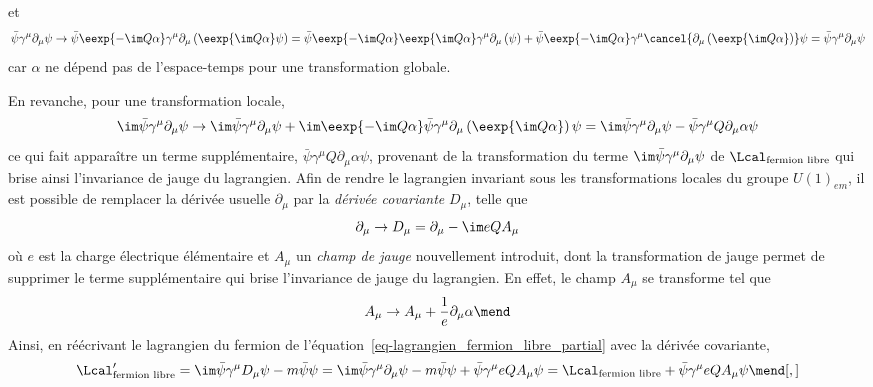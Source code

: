 et
\begin{equation}
\bar{\psi} \gamma^\mu\partial_\mu \psi
\to
\bar{\psi}\eexp{-\im Q\alpha}
\gamma^\mu\partial_\mu
\left(\eexp{\im Q\alpha}\psi\right)
=
\bar{\psi}\eexp{-\im Q\alpha}
\eexp{\im Q\alpha}
\gamma^\mu\partial_\mu
\left(\psi\vphantom{\psi\eexp{\im Q\alpha}}\right)
+
\bar{\psi}\eexp{-\im Q\alpha}
\gamma^\mu
\cancel{\partial_\mu \left(\eexp{\im Q\alpha}\vphantom{\psi\eexp{\im Q\alpha}}\right)}\psi
= \bar{\psi} \gamma^\mu\partial_\mu \psi
\end{equation}
car $\alpha$ ne dépend pas de l'espace-temps pour une transformation globale.
\par En revanche, pour une transformation locale, %
\begin{equation}
\im\bar{\psi} \gamma^\mu\partial_\mu \psi
\to
\im\bar{\psi} \gamma^\mu\partial_\mu \psi
+
\im\eexp{-\im Q\alpha}
\bar{\psi}
\gamma^\mu
\partial_\mu
\left(\eexp{\im Q\alpha}\vphantom{\psi\eexp{\im Q\alpha}}\right)
\psi
=
\im\bar{\psi} \gamma^\mu\partial_\mu \psi
-
\bar{\psi}
\gamma^\mu
Q\partial_\mu
\alpha
\psi
\label{eq-QED_jauge_brisee}
\end{equation}
ce qui fait apparaître un terme supplémentaire, $\bar{\psi}\gamma^\mu Q\partial_\mu\alpha\psi$, provenant de la transformation du terme $\im \bar{\psi} \gamma^\mu\partial_\mu \psi$ de $\Lcal_{\text{fermion libre}}$ qui brise ainsi l'invariance de jauge du lagrangien.
Afin de rendre le lagrangien invariant sous les transformations locales du groupe $U(1)_{em}$, il est possible de remplacer la dérivée usuelle $\partial_\mu$ par la \emph{dérivée covariante} $D_\mu$, telle que
\begin{equation}
\partial_\mu \to D_\mu = \partial_\mu - \im eQ A_\mu
\end{equation}
où $e$ est la charge électrique élémentaire et $A_\mu$ un \emph{champ de jauge} nouvellement introduit, dont la transformation de jauge permet de supprimer le terme supplémentaire qui brise l'invariance de jauge du lagrangien. En effet, le champ $A_\mu$ se transforme tel que
\begin{equation}
A_\mu \to A_\mu + \frac{1}{e} \partial_\mu\alpha
\mend
\end{equation}
Ainsi, en réécrivant le lagrangien du fermion de l'équation~\eqref{eq-lagrangien_fermion_libre_partial} avec la dérivée covariante,
\begin{equation}
\Lcal_{\text{fermion libre}}' = \im \bar{\psi} \gamma^\mu D_\mu \psi - m \bar{\psi}\psi
= \im \bar{\psi} \gamma^\mu\partial_\mu \psi - m \bar{\psi}\psi + \bar{\psi}\gamma^\mu eQA_\mu \psi
= \Lcal_{\text{fermion libre}} + \bar{\psi}\gamma^\mu eQA_\mu \psi
\mend[,]
\end{equation}
